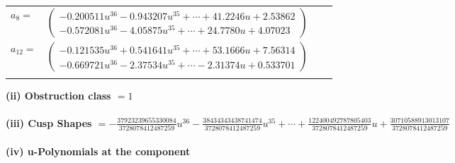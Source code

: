 \documentclass[1p]{elsarticle_modified}
\theoremstyle{definition}
\begin{document}
\begin{tabular}{m{7pt} m{180pt} m{7pt} m{180pt} }
\flushright $a_{8}=$&$\begin{pmatrix}-0.200511 u^{36}-0.943207 u^{35}+\cdots+41.2246 u+2.53862\\-0.572081 u^{36}-4.05875 u^{35}+\cdots+24.7780 u+4.07023\end{pmatrix}$ \\
\flushright $a_{12}=$&$\begin{pmatrix}-0.121535 u^{36}+0.541641 u^{35}+\cdots+53.1666 u+7.56314\\-0.669721 u^{36}-2.37534 u^{35}+\cdots-2.31374 u+0.533701\end{pmatrix}$\\&\end{tabular}
\flushleft \textbf{(ii) Obstruction class $= 1$}\\~\\
\flushleft \textbf{(iii) Cusp Shapes $= -\frac{37923239655330084}{3728078412487259} u^{36}-\frac{38434343438741474}{3728078412487259} u^{35}+\cdots+\frac{122400492787805403}{3728078412487259} u+\frac{30710588913013107}{3728078412487259}$}\\~\\
\newpage\renewcommand{\arraystretch}{1}
\flushleft \textbf{(iv) u-Polynomials at the component}\newline \\
\end{document}
